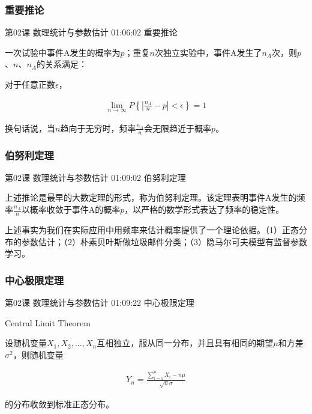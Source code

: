\documentclass[UTF8]{ctexbook}
\begin{document}
\subsubsection{重要推论}

第02课 数理统计与参数估计 01:06:02 重要推论

一次试验中事件A发生的概率为$p$；重复$n$次独立实验中，事件A发生了$n_{A}$次，则$p$、$n$、$n_{A}$的关系满足：

对于任意正数$\epsilon$，

\begin{equation}
\begin{aligned}
\underset{n \rightarrow \infty}{\lim} P \left \{  |\frac{n_{A}}{n}-p| <\epsilon  \right \}=1
\end{aligned}
\end{equation}

换句话说，当$n$趋向于无穷时，频率$\frac{n_{A}}{n}$会无限趋近于概率$p$。

\subsubsection{伯努利定理}

第02课 数理统计与参数估计 01:09:02 伯努利定理

上述推论是最早的大数定理的形式，称为伯努利定理。该定理表明事件A发生的频率$\frac{n_{A}}{n}$以概率收敛于事件A的概率$p$，以严格的数学形式表达了频率的稳定性。

上述事实为我们在实际应用中用频率来估计概率提供了一个理论依据。（1）正态分布的参数估计；（2）朴素贝叶斯做垃圾邮件分类；（3）隐马尔可夫模型有监督参数学习。

\subsubsection{中心极限定理}

第02课 数理统计与参数估计 01:09:22 中心极限定理

Central Limit Theorem

设随机变量$X_{1},X_{2},\dots,X_{n}$互相独立，服从同一分布，并且具有相同的期望$\mu$和方差$\sigma^{2}$，则随机变量

\begin{equation}
\begin{aligned}
Y_{n}=\frac{\sum_{i=1}^{n}X_{i}-n\mu}{\sqrt{n}\sigma}
\end{aligned}
\end{equation}

的分布收敛到标准正态分布。
\end{document}
